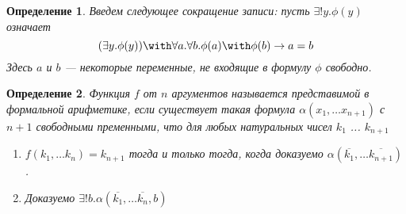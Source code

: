 \documentclass[10pt,a4paper,oneside]{article}
\newtheorem{definition}{Определение}
\begin{document}
\begin{definition} Введем следующее сокращение записи:
пусть $\exists ! y . \phi (y)$ означает 
$$(\exists y . \phi (y)) \with \forall a .\forall b .\phi(a) \with \phi(b) \rightarrow a=b$$
Здесь $a$ и $b$ --- некоторые переменные, не входящие в формулу $\phi$ свободно.
\end{definition}

\begin{definition} Функция $f$ от $n$ аргументов называется представимой в 
формальной арифметике, если существует такая формула $\alpha (x_1, \dots x_{n+1})$ с $n+1$ 
свободными пременными, что для любых натуральных чисел $k_1$ ... $k_{n+1}$
\begin{enumerate}
\item $f(k_1, \dots k_n) = k_{n+1}$ тогда и только тогда, когда доказуемо 
$\alpha (\overline{k_1}, \dots \overline{k_{n+1}})$.
\item Доказуемо $\exists ! b . \alpha (\overline{k_1}, \dots \overline{k_n}, b)$
\end{enumerate}
\end{definition} 
\end{document}
